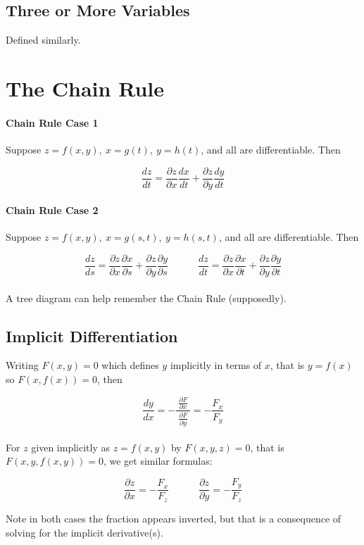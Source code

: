 \documentclass{report}  %
\begin{document}
\subsection*{Three or More Variables}
Defined similarly.

\newpage

\section{The Chain Rule}
\paragraph{Chain Rule Case 1} Suppose $z = f(x, y), \ x = g(t), \ y = h(t)$, and all are differentiable. Then

\begin{equation}
	\frac{dz}{dt} = \frac{\partial z}{\partial x} \frac{dx}{dt} + \frac{\partial z}{\partial y} \frac{dy}{dt}
\end{equation}

\paragraph{Chain Rule Case 2} Suppose $z = f(x, y), \ x = g(s, t), \ y = h(s, t)$, and all are differentiable. Then

\begin{equation}
	\frac{dz}{ds} = \frac{\partial z}{\partial x} \frac{\partial x}{ \partial s} + \frac{\partial z}{\partial y} \frac{\partial y}{\partial s}
	\qquad \quad
	\frac{dz}{dt} = \frac{\partial z}{\partial x} \frac{\partial x}{ \partial t} + \frac{\partial z}{\partial y} \frac{\partial y}{\partial t}
\end{equation}
\\

A tree diagram can help remember the Chain Rule (supposedly). 

\subsection*{Implicit Differentiation}
Writing $F(x, y) = 0$ which defines $y$ implicitly in terms of $x$, that is $y = f(x)$ so $F(x, f(x)) = 0$, then 

\begin{equation}
	\frac{dy}{dx} = - \displaystyle \frac{\displaystyle  \ \frac{\partial F}{\partial x } \ }{\displaystyle \frac{\partial F}{\partial y}}
	= - \frac{F_x}{F_y}
\end{equation} \\

For $z$ given implicitly as $z = f(x, y)$ by $F(x, y, z) = 0$, that is $F(x, y, f(x, y)) = 0$, we get similar formulas: 

\begin{equation}
	\frac{\partial z}{\partial x} = - \frac{F_x}{F_z}
	\qquad \quad
	\frac{\partial z}{\partial y} = - \frac{F_y}{F_z}
\end{equation}

Note in both cases the fraction appears inverted, but that is a consequence of solving for the implicit derivative(s). 
\end{document}
